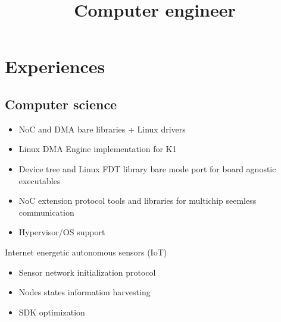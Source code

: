 \documentclass[11pt,a4paper,sans]{moderncv}        %
\title{Computer engineer}                               %
\begin{document}
\makecvtitle

\vspace*{-1.3cm}
\setlength{\hintscolumnwidth}{0.15\textwidth} %

\section{Experiences}
\subsection{Computer science}
	{
	\begin{itemize}
		\item NoC and DMA bare libraries + Linux drivers
		\item Linux DMA Engine implementation for K1
		\item Device tree and Linux FDT library bare mode port for board agnostic executables
		\item NoC extension protocol tools and libraries for multichip seemless communication
		\item Hypervisor/OS support
	\end{itemize}
	}
	{Internet energetic autonomous sensors (IoT)
	\begin{itemize}
		\item Sensor network initialization protocol
		\item Nodes states information harvesting
		\item SDK optimization
	\end{itemize}
	}
\end{document}
